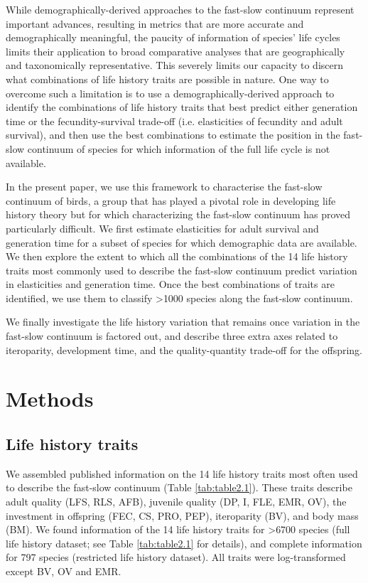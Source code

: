 While demographically-derived approaches to the fast-slow continuum represent
important advances, resulting in metrics that are more accurate and
demographically meaningful, the paucity of information of species’ life cycles
limits their application to broad comparative analyses that are geographically
and taxonomically representative. This severely limits our capacity to discern
what combinations of life history traits are possible in nature. One way to
overcome such a limitation is to use a demographically-derived approach to
identify the combinations of life history traits that best predict either
generation time or the fecundity-survival trade-off (i.e. elasticities of
fecundity and adult survival), and then use the best combinations to estimate
the position in the fast-slow continuum of species for which information of the
full life cycle is not available.

In the present paper, we use this framework to characterise the fast-slow
continuum of birds, a group that has played a pivotal role in developing life
history theory but for which characterizing the fast-slow continuum has proved
particularly difficult. We first estimate elasticities for adult survival and
generation time for a subset of species for which demographic data are
available. We then explore the extent to which all the combinations of the 14
life history traits most commonly used to describe the fast-slow continuum 
predict variation in elasticities and generation time. Once the best 
combinations of traits are identified, we use them to classify 
\textgreater{1000} species along the fast-slow continuum.

We finally investigate the life history variation that remains once variation
in the fast-slow continuum is factored out, and describe three extra axes
related to iteroparity, development time, and the quality-quantity trade-off for
the offspring.


\section{Methods}

\subsection*{Life history traits}

We assembled published information on the 14 life history traits most often used
to describe the fast-slow continuum (Table \ref{tab:table2.1}). These traits
describe adult quality (LFS, RLS, AFB), juvenile quality (DP, I, FLE, EMR,
OV), the investment in offspring (FEC, CS, PRO, PEP), iteroparity (BV), and body
mass (BM). We found information of the 14 life history traits for 
\textgreater{6700} species (full life history dataset; see Table 
\ref{tab:table2.1} for details), and complete information for 797 species 
(restricted life history dataset). All traits were log-transformed except BV, 
OV and EMR.



